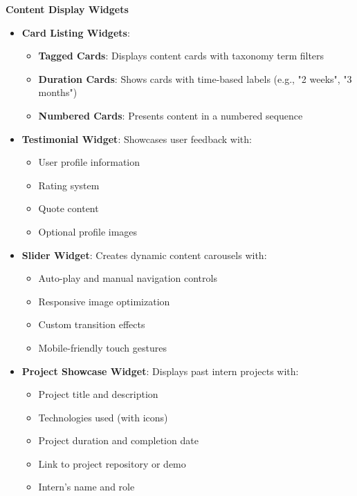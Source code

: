 \textbf{Content Display Widgets}
\begin{itemize}
    \item \textbf{Card Listing Widgets}:
    \begin{itemize}
        \item \textbf{Tagged Cards}: Displays content cards with taxonomy term filters
        \item \textbf{Duration Cards}: Shows cards with time-based labels (e.g., "2 weeks", "3 months")
        \item \textbf{Numbered Cards}: Presents content in a numbered sequence
    \end{itemize}
    
    \item \textbf{Testimonial Widget}: Showcases user feedback with:
    \begin{itemize}
        \item User profile information
        \item Rating system
        \item Quote content
        \item Optional profile images
    \end{itemize}

    \item \textbf{Slider Widget}: Creates dynamic content carousels with:
    \begin{itemize}
        \item Auto-play and manual navigation controls
        \item Responsive image optimization
        \item Custom transition effects
        \item Mobile-friendly touch gestures
    \end{itemize}

    \item \textbf{Project Showcase Widget}: Displays past intern projects with:
    \begin{itemize}
        \item Project title and description
        \item Technologies used (with icons)
        \item Project duration and completion date
        \item Link to project repository or demo
        \item Intern's name and role
    \end{itemize}
\end{itemize}



